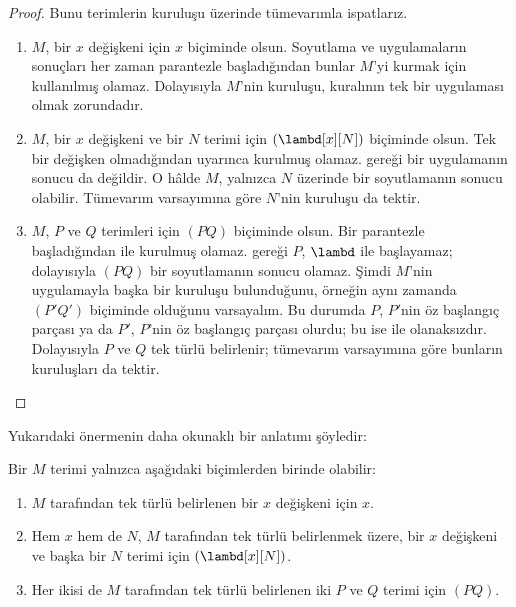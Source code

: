 \begin{proof}
  Bunu terimlerin kuruluşu üzerinde tümevarımla ispatlarız.
  \begin{enumerate}
    \item $M$, bir $x$ değişkeni için $x$ biçiminde olsun. Soyutlama ve
      uygulamaların sonuçları her zaman parantezle başladığından bunlar
      $M$'yi kurmak için kullanılmış olamaz. Dolayısıyla $M$'nin kuruluşu,
       kuralının tek bir
      uygulaması olmak zorundadır.
    \item $M$, bir $x$ değişkeni ve bir $N$ terimi için
      $(\lambd[x][N])$ biçiminde olsun. Tek bir değişken olmadığından
       uyarınca kurulmuş
      olamaz.  gereği bir uygulamanın sonucu da değildir.
      O hâlde $M$, yalnızca $N$ üzerinde bir soyutlamanın sonucu olabilir.
      Tümevarım varsayımına göre $N$'nin kuruluşu da tektir.
    \item $M$, $P$ ve $Q$ terimleri için $(PQ)$ biçiminde olsun. Bir
      parantezle başladığından
       ile kurulmuş olamaz.
       gereği $P$, $\lambd$ ile başlayamaz; dolayısıyla
      $(PQ)$ bir soyutlamanın sonucu olamaz. Şimdi $M$'nin uygulamayla başka
      bir kuruluşu bulunduğunu, örneğin aynı zamanda $(P'Q')$ biçiminde
      olduğunu varsayalım. Bu durumda $P$, $P'$nin öz başlangıç parçası ya da
      $P'$, $P$'nin öz başlangıç parçası olurdu; bu ise
       ile olanaksızdır. Dolayısıyla $P$ ve $Q$ tek türlü
      belirlenir; tümevarım varsayımına göre bunların kuruluşları da tektir.
  \end{enumerate}
\end{proof}

Yukarıdaki önermenin daha okunaklı bir anlatımı şöyledir:
\begin{prop}
  Bir $M$ terimi yalnızca aşağıdaki biçimlerden birinde olabilir:
  \begin{enumerate}
    \item $M$ tarafından tek türlü belirlenen bir $x$ değişkeni için $x$.
    \item Hem $x$ hem de $N$, $M$ tarafından tek türlü belirlenmek üzere,
      bir $x$ değişkeni ve başka bir $N$ terimi için $(\lambd[x][N])$.
    \item Her ikisi de $M$ tarafından tek türlü belirlenen iki $P$ ve $Q$
      terimi için $(PQ)$.
  \end{enumerate}
\end{prop}

